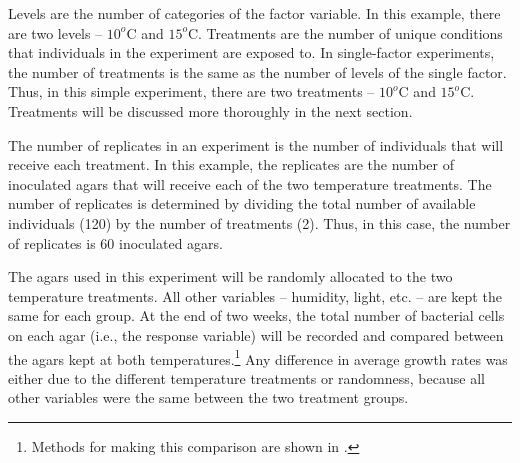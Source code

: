 \documentclass[10pt,openany]{book}\usepackage[]{graphicx}\usepackage[]{color}
\begin{document}
Levels are the number of categories of the factor variable.  In this example, there are two levels -- $10^{o}$C and $15^{o}$C.  Treatments are the number of unique conditions that individuals in the experiment are exposed to.  In single-factor experiments, the number of treatments is the same as the number of levels of the single factor.  Thus, in this simple experiment, there are two treatments -- $10^{o}$C and $15^{o}$C.  Treatments will be discussed more thoroughly in the next section.

The number of replicates in an experiment is the number of individuals that will receive each treatment.  In this example, the replicates are the number of inoculated agars that will receive each of the two temperature treatments.  The number of replicates is determined by dividing the total number of available individuals (120) by the number of treatments (2).  Thus, in this case, the number of replicates is 60 inoculated agars.


\vspace{-12pt}

\vspace{-12pt}

\vspace{-12pt}

The agars used in this experiment will be randomly allocated to the two temperature treatments.  All other variables -- humidity, light, etc. -- are kept the same for each group.  At the end of two weeks, the total number of bacterial cells on each agar (i.e., the response variable) will be recorded and compared between the agars kept at both temperatures.\footnote{Methods for making this comparison are shown in .}  Any difference in average growth rates was either due to the different temperature treatments or randomness, because all other variables were the same between the two treatment groups.

\end{document}
